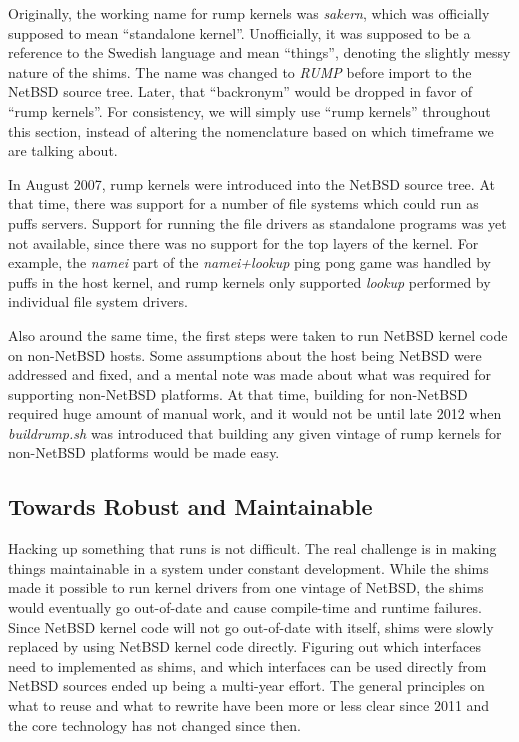 Originally, the working name for rump kernels was \textit{sakern}, which
was officially supposed to mean ``standalone kernel''.  Unofficially, it
was supposed to be a reference to the Swedish language and mean
``things'', denoting the slightly messy nature of the shims.  The name
was changed to \textit{RUMP} before import to the NetBSD source tree.  Later, that ``backronym''
would be dropped in favor of ``rump kernels''.  For consistency, we will
simply use ``rump kernels'' throughout this section, instead of altering
the nomenclature based on which timeframe we are talking about.

In August 2007, rump kernels were introduced into the NetBSD
source tree.  At that time, there was support for a number of file
systems which could run as puffs servers.  Support for running the file
drivers as standalone programs was yet not available, since there was no
support for the top layers of the kernel.  For example, the \textit{namei}
part of the \textit{namei+lookup} ping pong game was handled by puffs
in the host kernel, and rump kernels only supported \textit{lookup}
performed by individual file system drivers.

Also around the same time, the first steps were taken to run NetBSD
kernel code on non-NetBSD hosts.  Some assumptions about the host being
NetBSD were addressed and fixed, and a mental note was made about what was
required for supporting non-NetBSD platforms.  At that time, building for
non-NetBSD required huge amount of manual work, and it would not be until
late 2012 when \textit{buildrump.sh} was introduced that building any
given vintage of rump kernels for non-NetBSD platforms would be made easy.


\subsection{Towards Robust and Maintainable}

Hacking up something that runs is not difficult.  The real challenge is
in making things maintainable in a system under constant development.
While the shims made it possible to run kernel drivers from one vintage of
NetBSD, the shims would eventually go out-of-date and cause compile-time
and runtime failures.  Since NetBSD kernel code will not go out-of-date
with itself, shims were slowly replaced by using NetBSD kernel code
directly.  Figuring out which interfaces need to implemented as shims,
and which interfaces can be used directly from NetBSD sources ended up
being a multi-year effort.  The general principles on what to reuse and
what to rewrite have been more or less clear since 2011 and
the core technology has not changed since then.


